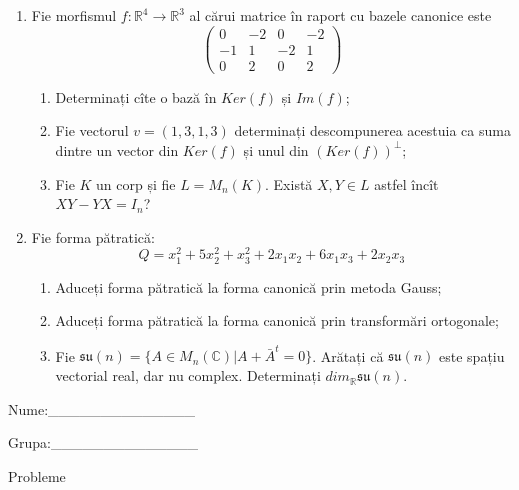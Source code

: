 \documentclass{article}
\begin{document}
\begin{enumerate}
 \item Fie morfismul $f:\mathbb{R}^4 \to \mathbb{R}^3$ al cărui matrice în raport cu bazele canonice este
$$\begin{pmatrix}
0&-2&0&-2\\
-1&1&-2&1\\
0&2&0&2
\end{pmatrix}$$

\begin{enumerate}
\item Determinați cîte o bază în $Ker(f)$ și $Im(f)$;
\item Fie vectorul $v=(1,3,1,3)$ determinați descompunerea acestuia ca suma dintre un vector din $Ker(f)$ și unul din $(Ker(f))^\perp$;
\item Fie $K$ un corp și fie $L=M_n(K)$. Există $X,Y \in L$ astfel încît $XY-YX=I_n$?  
\end{enumerate}
\item Fie forma pătratică:
$$Q= x_1^2+5x_2^2+x_3^2+2x_1x_2+6x_1x_3+2x_2x_3$$

\begin{enumerate}
\item Aduceți forma pătratică la forma canonică prin metoda Gauss;
\item Aduceți forma pătratică la forma canonică prin transformări ortogonale;
\item Fie $\mathfrak{su}(n)=\{ A \in M_n(\mathbb{C}) | A+\bar{A}^t=0\}$. Arătați că $\mathfrak{su}(n)$ este spațiu vectorial real, dar nu complex.
Determinați $dim_{\mathbb{R}}\mathfrak{su}(n)$.
\end{enumerate}
\end{enumerate}
\newpage
\begin{flushright}
Nume:\_\_\_\_\_\_\_\_\_\_\_\_\_\_
 
 
Grupa:\_\_\_\_\_\_\_\_\_\_\_\_\_\_
\end{flushright}
\begin{center}
\vspace{2cm}
{\Large Probleme}
\vspace{2cm}
\end{center}
\end{document}
